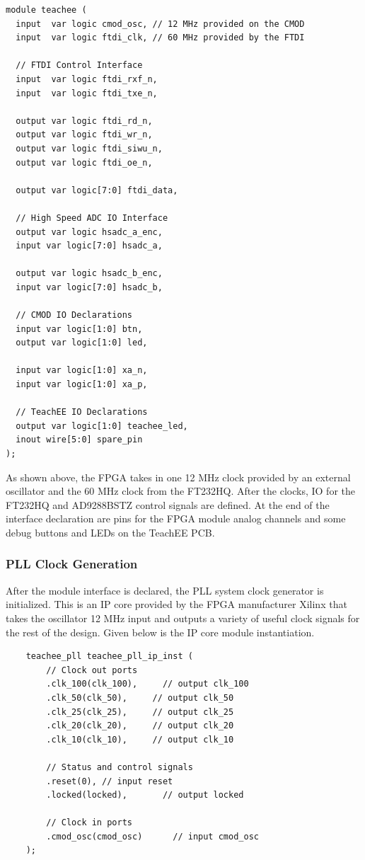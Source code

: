 \documentclass[letterpaper,11pt]{article}
\begin{document}
\begin{verbatim}
module teachee (
  input  var logic cmod_osc, // 12 MHz provided on the CMOD
  input  var logic ftdi_clk, // 60 MHz provided by the FTDI

  // FTDI Control Interface
  input  var logic ftdi_rxf_n,
  input  var logic ftdi_txe_n,

  output var logic ftdi_rd_n,
  output var logic ftdi_wr_n,
  output var logic ftdi_siwu_n,
  output var logic ftdi_oe_n,

  output var logic[7:0] ftdi_data,

  // High Speed ADC IO Interface
  output var logic hsadc_a_enc,
  input var logic[7:0] hsadc_a,

  output var logic hsadc_b_enc,
  input var logic[7:0] hsadc_b,

  // CMOD IO Declarations
  input var logic[1:0] btn,
  output var logic[1:0] led,

  input var logic[1:0] xa_n,
  input var logic[1:0] xa_p,

  // TeachEE IO Declarations
  output var logic[1:0] teachee_led,
  inout wire[5:0] spare_pin
);
\end{verbatim}

As shown above, the FPGA takes in one 12 MHz clock provided by an external
oscillator and the 60 MHz clock from the FT232HQ. After the clocks, IO for the
FT232HQ and AD9288BSTZ control signals are defined. At the end of the interface
declaration are pins for the FPGA module analog channels and some debug buttons
and LEDs on the TeachEE PCB.

\subsubsection{PLL Clock Generation}
After the module interface is declared, the PLL system clock generator is
initialized. This is an IP core provided by the FPGA manufacturer Xilinx that
takes the oscillator 12 MHz input and outputs a variety of useful clock signals
for the rest of the design. Given below is the IP core module instantiation.

\begin{verbatim}
    teachee_pll teachee_pll_ip_inst (
        // Clock out ports
        .clk_100(clk_100),     // output clk_100
        .clk_50(clk_50),     // output clk_50
        .clk_25(clk_25),     // output clk_25
        .clk_20(clk_20),     // output clk_20
        .clk_10(clk_10),     // output clk_10

        // Status and control signals
        .reset(0), // input reset
        .locked(locked),       // output locked

        // Clock in ports
        .cmod_osc(cmod_osc)      // input cmod_osc
    );
\end{verbatim}
\end{document}
